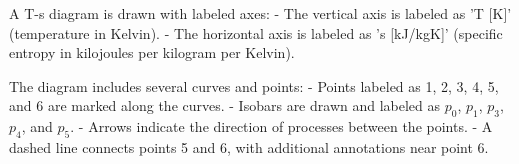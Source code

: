 A T-s diagram is drawn with labeled axes:  
- The vertical axis is labeled as 'T [K]' (temperature in Kelvin).  
- The horizontal axis is labeled as 's [kJ/kgK]' (specific entropy in kilojoules per kilogram per Kelvin).  

The diagram includes several curves and points:  
- Points labeled as 1, 2, 3, 4, 5, and 6 are marked along the curves.  
- Isobars are drawn and labeled as \( p_0 \), \( p_1 \), \( p_3 \), \( p_4 \), and \( p_5 \).  
- Arrows indicate the direction of processes between the points.  
- A dashed line connects points 5 and 6, with additional annotations near point 6.